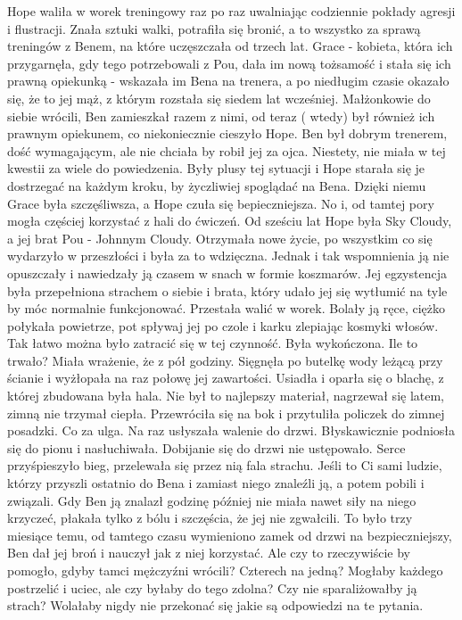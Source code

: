 \documentclass[12pt,a4paper]{book}
\begin{document}
Hope waliła w worek treningowy raz po raz uwalniając codziennie pokłady agresji i flustracji. Znała sztuki walki, potrafiła się bronić, a to wszystko za sprawą treningów z Benem, na które uczęszczała od trzech lat. Grace - kobieta, która ich przygarnęła, gdy tego potrzebowali z Pou, dała im nową tożsamość i stała się ich prawną opiekunką - wskazała im Bena na trenera, a po niedługim czasie okazało się, że to jej mąż, z którym rozstała się siedem lat wcześniej. Małżonkowie do siebie wrócili, Ben zamieszkał razem z nimi, od teraz ( wtedy) był również ich prawnym opiekunem, co niekoniecznie cieszyło Hope. Ben był dobrym trenerem, dość wymagającym, ale nie chciała by robił jej za ojca. Niestety, nie miała w tej kwestii za wiele do powiedzenia. Były plusy tej sytuacji i Hope starała się je dostrzegać na każdym kroku, by życzliwiej spoglądać na Bena. Dzięki niemu Grace była szczęśliwsza, a Hope czuła się bepieczniejsza. No i, od tamtej pory mogła częściej korzystać z hali do ćwiczeń. 
Od sześciu lat Hope była Sky Cloudy, a jej brat Pou - Johnnym Cloudy. Otrzymała nowe życie, po wszystkim co się wydarzyło w przeszłości i była za to wdzięczna. Jednak i tak wspomnienia ją nie opuszczały i nawiedzały ją czasem w snach w formie koszmarów. Jej egzystencja była przepełniona strachem o siebie i brata, który udało jej się wytłumić na tyle by móc normalnie funkcjonować.
Przestała walić w worek. Bolały ją ręce, ciężko połykała powietrze, pot spływaj jej po czole i karku zlepiając kosmyki włosów. Tak łatwo można było zatracić się w tej czynność. Była wykończona. Ile to trwało? Miała wrażenie, że z pół godziny. 
Sięgnęła po butelkę wody leżącą przy ścianie i wyżłopała na raz połowę jej zawartości. Usiadła i oparła się o blachę, z której zbudowana była hala. Nie był to najlepszy materiał, nagrzewał się latem, zimną nie trzymał ciepła. Przewróciła się na bok i przytuliła policzek do zimnej posadzki. Co za ulga. 
Na raz usłyszała walenie do drzwi. Błyskawicznie podniosła się do pionu i nasłuchiwała. Dobijanie się do drzwi nie ustępowało. Serce przyśpieszyło bieg, przelewała się przez nią fala strachu. Jeśli to Ci sami ludzie, którzy przyszli ostatnio do Bena i zamiast niego znaleźli ją, a potem pobili i związali. Gdy Ben ją znalazł godzinę później nie miała nawet siły na niego krzyczeć, płakała tylko z bólu i szczęścia, że jej nie zgwałcili. To było trzy miesiące temu, od tamtego czasu wymieniono zamek od drzwi na bezpieczniejszy, Ben dał jej broń i nauczył jak z niej korzystać. Ale czy to rzeczywiście by pomogło, gdyby tamci mężczyźni wrócili? Czterech na jedną? Mogłaby każdego postrzelić i uciec, ale czy byłaby do tego zdolna? Czy nie sparaliżowałby ją strach? Wolałaby nigdy nie przekonać się jakie są odpowiedzi na te pytania.
\end{document}
